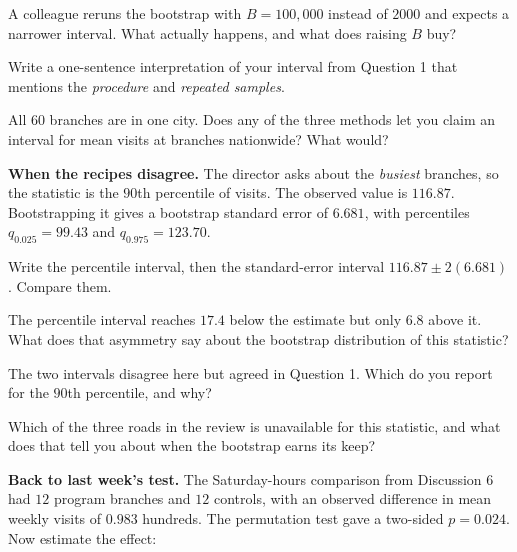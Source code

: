 \documentclass[11pt]{article}
\newcommand{\answerspace}[1]{\vspace{#1}}
\begin{document}
\begin{questions}
\begin{parts}
\item A colleague reruns the bootstrap with $B = 100{,}000$ instead of $2000$ and expects a narrower
interval. What actually happens, and what does raising $B$ buy?
\answerspace{4em}

\item Write a one-sentence interpretation of your interval from Question 1 that mentions the
\emph{procedure} and \emph{repeated samples}.
\answerspace{4em}

\item All 60 branches are in one city. Does any of the three methods let you claim an interval for
mean visits at branches nationwide? What would?
\answerspace{4em}
\end{parts}

\item \textbf{When the recipes disagree.} The director asks about the \emph{busiest} branches, so
the statistic is the $90$th percentile of visits. The observed value is $116.87$.
Bootstrapping it gives a bootstrap standard error of $6.681$, with percentiles
$q_{0.025} = 99.43$ and $q_{0.975} = 123.70$.

\begin{parts}
\item Write the percentile interval, then the standard-error interval
$116.87 \pm 2(6.681)$. Compare them.
\answerspace{4.5em}

\item The percentile interval reaches $17.4$ below the estimate but only $6.8$ above it. What does
that asymmetry say about the bootstrap distribution of this statistic?
\answerspace{4em}

\item The two intervals disagree here but agreed in Question 1. Which do you report for the $90$th
percentile, and why?
\answerspace{4em}

\item Which of the three roads in the review is unavailable for this statistic, and what does that
tell you about when the bootstrap earns its keep?
\answerspace{4em}
\end{parts}

\item \textbf{Back to last week's test.} The Saturday-hours comparison from Discussion 6 had
$12$ program branches and $12$ controls, with an observed difference in mean weekly visits of
$0.983$ hundreds. The permutation test gave a two-sided $p = 0.024$. Now estimate the effect:


\end{questions}
\end{document}
